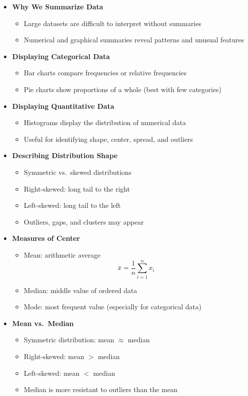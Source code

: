 \documentclass{article}
\begin{document}
\begin{itemize}

\item \textbf{Why We Summarize Data}
\begin{itemize}
  \item Large datasets are difficult to interpret without summaries
  \item Numerical and graphical summaries reveal patterns and unusual features
\end{itemize}

\item \textbf{Displaying Categorical Data}
\begin{itemize}
  \item Bar charts compare frequencies or relative frequencies
  \item Pie charts show proportions of a whole (best with few categories)
\end{itemize}

\item \textbf{Displaying Quantitative Data}
\begin{itemize}
  \item Histograms display the distribution of numerical data
  \item Useful for identifying shape, center, spread, and outliers
\end{itemize}

\item \textbf{Describing Distribution Shape}
\begin{itemize}
  \item Symmetric vs.\ skewed distributions
  \item Right-skewed: long tail to the right
  \item Left-skewed: long tail to the left
  \item Outliers, gaps, and clusters may appear
\end{itemize}

\item \textbf{Measures of Center}
\begin{itemize}
  \item Mean: arithmetic average
  \[
  \bar{x} = \frac{1}{n}\sum_{i=1}^n x_i
  \]
  \item Median: middle value of ordered data
  \item Mode: most frequent value (especially for categorical data)
\end{itemize}

\item \textbf{Mean vs.\ Median}
\begin{itemize}
  \item Symmetric distribution: mean $\approx$ median
  \item Right-skewed: mean $>$ median
  \item Left-skewed: mean $<$ median
  \item Median is more resistant to outliers than the mean
\end{itemize}


\end{itemize}
\end{document}
